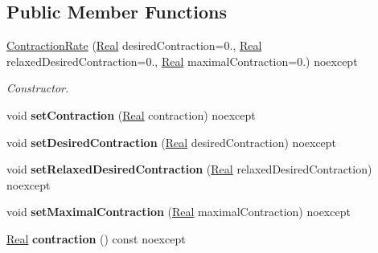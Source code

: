 \subsection*{Public Member Functions}
\begin{DoxyCompactItemize}
\item 
\hyperlink{classSpacy_1_1Mixin_1_1ContractionRate_a3d6b03823ce3951bafd51ceaac732bf7}{Contraction\+Rate} (\hyperlink{classSpacy_1_1Real}{Real} desired\+Contraction=0., \hyperlink{classSpacy_1_1Real}{Real} relaxed\+Desired\+Contraction=0., \hyperlink{classSpacy_1_1Real}{Real} maximal\+Contraction=0.) noexcept
\begin{DoxyCompactList}\small\item\em Constructor. \end{DoxyCompactList}\item 
\hypertarget{classSpacy_1_1Mixin_1_1ContractionRate_ab9215981f0454bd5d641abad582e64e5}{}void {\bfseries set\+Contraction} (\hyperlink{classSpacy_1_1Real}{Real} contraction) noexcept\label{classSpacy_1_1Mixin_1_1ContractionRate_ab9215981f0454bd5d641abad582e64e5}

\item 
\hypertarget{classSpacy_1_1Mixin_1_1ContractionRate_a26eaa6344b5b2191931a9fd87ed96f39}{}void {\bfseries set\+Desired\+Contraction} (\hyperlink{classSpacy_1_1Real}{Real} desired\+Contraction) noexcept\label{classSpacy_1_1Mixin_1_1ContractionRate_a26eaa6344b5b2191931a9fd87ed96f39}

\item 
\hypertarget{classSpacy_1_1Mixin_1_1ContractionRate_ac6e47c0ab683643fea7490703f02632d}{}void {\bfseries set\+Relaxed\+Desired\+Contraction} (\hyperlink{classSpacy_1_1Real}{Real} relaxed\+Desired\+Contraction) noexcept\label{classSpacy_1_1Mixin_1_1ContractionRate_ac6e47c0ab683643fea7490703f02632d}

\item 
\hypertarget{classSpacy_1_1Mixin_1_1ContractionRate_acc99ba536cd9a027baa50a1412d9d216}{}void {\bfseries set\+Maximal\+Contraction} (\hyperlink{classSpacy_1_1Real}{Real} maximal\+Contraction) noexcept\label{classSpacy_1_1Mixin_1_1ContractionRate_acc99ba536cd9a027baa50a1412d9d216}

\item 
\hypertarget{classSpacy_1_1Mixin_1_1ContractionRate_a6c5e653393be91e468364733702e5334}{}\hyperlink{classSpacy_1_1Real}{Real} {\bfseries contraction} () const noexcept\label{classSpacy_1_1Mixin_1_1ContractionRate_a6c5e653393be91e468364733702e5334}


\end{DoxyCompactItemize}

